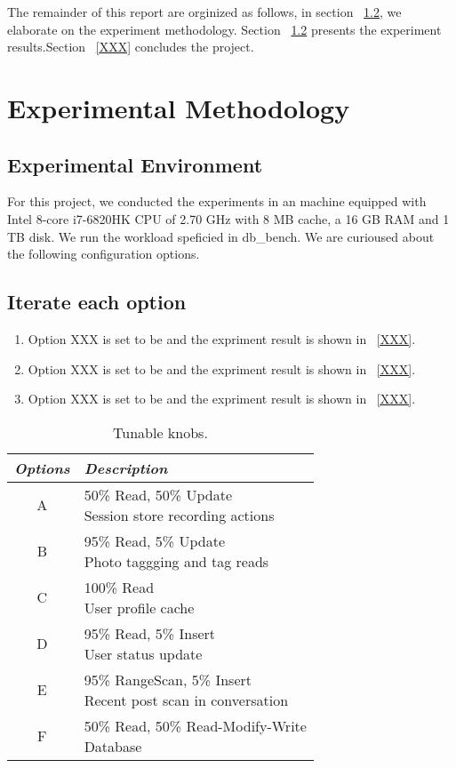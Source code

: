 \documentclass[letter,twocolumn,10pt]{article}
\begin{document}
The remainder of this report are orginized as follows, in section ~\ref{}, we elaborate on the experiment methodology. Section ~\ref{} presents the experiment results.Section ~\ref{XXX} concludes the project. 
\section{Experimental Methodology}
\subsection {Experimental Environment}
For this project, we conducted the experiments in an machine equipped with Intel 8-core
i7-6820HK CPU of 2.70 GHz with 8 MB cache, a 16 GB RAM and 1 TB disk. We run the workload speficied in \textsf{db\_bench}. We are curioused about the following configuration options.

\subsection {Iterate each option}
\begin{enumerate}
\item Option XXX is set to be and the expriment result is shown in ~\ref{XXX}.
\item Option XXX is set to be and the expriment result is shown in ~\ref{XXX}.
\item Option XXX is set to be and the expriment result is shown in ~\ref{XXX}.
\end{enumerate}

\begin{table}
	\centering
	\small
	\begin{tabular}{c  l}
		\hline
		\bf{\textit{Options}} & \bf{\textit{Description}} \\ \hline
		A & \makecell[l]{{50\% Read, 50\% Update} \\ {Session store recording actions}} \\ \hline 
		B & \makecell[l]{{95\% Read, 5\% Update} \\ {Photo taggging and tag reads}}\\ \hline
		C & \makecell[l]{{100\% Read} \\ {User profile cache}} \\ \hline
		D & \makecell[l]{{95\% Read, 5\% Insert} \\ {User status update}} \\ \hline
		E & \makecell[l]{{95\% RangeScan, 5\% Insert} \\ {Recent post scan in conversation}} \\ \hline   
		F & \makecell[l]{{50\% Read, 50\% Read-Modify-Write} \\ {Database}} \\ \hline
	\end{tabular}
	\caption{Tunable knobs.}
	\label{knobs}
\end{table}
\end{document}

